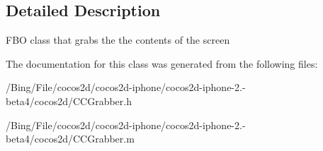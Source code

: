 \subsection{Detailed Description}
F\-B\-O class that grabs the the contents of the screen 

The documentation for this class was generated from the following files\-:\begin{DoxyCompactItemize}
\item 
/\-Bing/\-File/cocos2d/cocos2d-\/iphone/cocos2d-\/iphone-\/2.-\/beta4/cocos2d/C\-C\-Grabber.\-h\item 
/\-Bing/\-File/cocos2d/cocos2d-\/iphone/cocos2d-\/iphone-\/2.-\/beta4/cocos2d/C\-C\-Grabber.\-m\end{DoxyCompactItemize}
